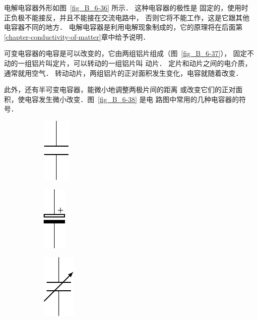 电解电容器外形如图~\ref{fig_B_6-36} 所示．
这种电容器的极性是
固定的，使用时正负极不能接反，并且不能接在交流电路中，
否则它将不能工作，这是它跟其他电容器不同的地方．
电解电容器是利用电解现象制成的，它的原理将在后面第\ref{chapter-conductivity-of-matter}章中给予说明．


可变电容器的电容是可以改变的，它由两组铝片组成（图~\ref{fig_B_6-37}），
固定不动的一组铝片叫定片，可以转动的一组铝片叫
动片．
定片和动片之间的电介质，通常就用空气．
转动动片，两组铝片的正对面积发生变化，电容就随着改变．

此外，还有半可变电容器，能微小地调整两极片间的距离
或改变它们的正对面积，使电容发生微小改变．图~\ref{fig_B_6-38} 是电
路图中常用的几种电容器的符号．

\begin{figure}[htbp]
    \centering
    \begin{subfigure}{0.2\linewidth}
        \centering
        \includegraphics{fig/B/6-38a.pdf}
        \caption{}\label{fig_B_6-38a}
    \end{subfigure}
    \hfil
    \begin{subfigure}{0.2\linewidth}
        \centering
        \includegraphics{fig/B/6-38b.pdf}
        \caption{}\label{fig_B_6-38b}
    \end{subfigure}
    \hfil
    \begin{subfigure}{0.2\linewidth}
        \centering
        \includegraphics{fig/B/6-38c.pdf}
        \caption{}\label{fig_B_6-38c}
    \end{subfigure}

\end{figure}
